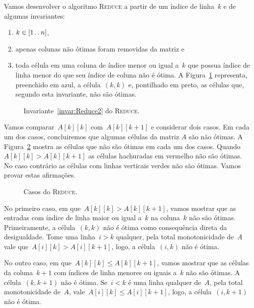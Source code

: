 Vamos desenvolver o algoritmo \textsc{Reduce} a partir de um índice de linha~$k$ e de algumas invariantes: 
\begin{enumerate}
    \item $k \in [1 \,.\,.\, n]$, \label{invar:Reduce0}
    \item apenas colunas não ótimas foram removidas da matriz e \label{invar:Reduce1}
    \item toda célula em uma coluna de índice menor ou igual a~$k$ que possua índice de linha menor do que seu índice de coluna não é ótima. A Figura~\ref{figure:Reduce1} representa, preenchido em azul, a célula~$(k,k)$ e, pontilhado em preto, as células que, segundo esta invariante, não são ótimas. \label{invar:Reduce2}
\end{enumerate}

\begin{figure}[h]
    \centering
    
    \caption{Invariante~\ref{invar:Reduce2} do \textsc{Reduce}.} \label{figure:Reduce1}
\end{figure}

Vamos comparar~$A[k][k]$ com~$A[k][k+1]$ e considerar dois casos. Em cada um dos casos, concluiremos que algumas células da matriz $A$ são não ótimas. A Figura~\ref{figure:Reduce2} mostra as células que não são ótimas em cada um dos casos. Quando~$A[k][k] > A[k][k+1]$ as células hachuradas em vermelho não são ótimas. No caso contrário as células com linhas verticais verdes não são ótimas. Vamos provar estas afirmações.

\begin{figure}[h]
    \centering
    
    \caption{Casos do \textsc{Reduce}.} \label{figure:Reduce2}
\end{figure}

No primeiro caso, em que~$A[k][k] > A[k][k+1]$, vamos mostrar que as entradas com índice de linha maior ou igual a~$k$ na coluna~$k$ não são ótimas. Primeiramente, a célula~$(k,k)$ não é ótima como consequência direta da desigualdade. Tome uma linha~${ i > k }$ qualquer, pela total monotonicidade de~$A$ vale que~${ A[i][k] > A[i][k+1] }$, logo, a célula~$(i,k)$ não é ótima.

No outro caso, em que~$A[k][k] \leq A[k][k+1]$, vamos mostrar que as células da coluna~$k+1$ com índices de linha menores ou iguais a~$k$ não são ótimas. A célula~$(k,k+1)$ não é ótima. Se~${ i < k }$ é uma linha qualquer de~$A$, pela total monotonicidade de~$A$, vale~${ A[i][k] \leq A[i][k+1] }$, logo, a célula~$(i,k+1)$ não é ótima.

